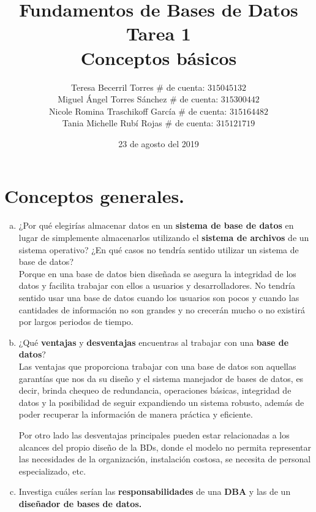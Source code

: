 \documentclass[letterpaper,12pt]{article}
\title{Fundamentos de Bases de Datos \\
        Tarea 1 \\
        Conceptos básicos}
\author{Teresa Becerril Torres
            $\#$ de cuenta: $315045132$ \\
            Miguel Ángel Torres Sánchez
            $\#$ de cuenta: $315300442$ \\
            Nicole Romina Traschikoff García
            $\#$ de cuenta: $315164482$ \\
            Tania Michelle Rubí Rojas
            $\#$ de cuenta: $315121719$}
\date{23 de agosto del 2019}
\begin{document}
    \maketitle

    \section{Conceptos generales.}
          \begin{enumerate}[a. ]

            \item ¿Por qué elegirías almacenar datos en un \textbf{sistema de base de datos} en lugar de simplemente almacenarlos utilizando el \textbf{sistema de archivos} de un sistema operativo? ¿En qué casos no tendría sentido utilizar un sistema de base de datos? \\

          Porque en una base de datos bien diseñada se asegura la integridad de los datos y facilita trabajar con ellos a usuarios y desarrolladores. No tendría sentido usar una base de datos cuando los usuarios son pocos y cuando las cantidades de información no son grandes y no crecerán mucho o no existirá por largos periodos de tiempo.

            \item ¿Qué \textbf{ventajas} y \textbf{desventajas} encuentras al trabajar con una \textbf{base de datos}?\\

            Las ventajas que proporciona trabajar con una base de datos son aquellas garantías que nos da su diseño y el sistema manejador de bases de datos, es decir, brinda chequeo de redundancia, operaciones básicas, integridad de datos y la posibilidad de seguir expandiendo un sistema robusto, además de poder recuperar la información de manera práctica y eficiente.

            Por otro lado las desventajas principales pueden estar relacionadas a los alcances del propio diseño de la BDs, donde el modelo no permita representar las necesidades de la organización, instalación costosa, se necesita de personal especializado, etc.


            \item Investiga cuáles serían las \textbf{responsabilidades} de una \textbf{DBA} y las de un \textbf{diseñador de bases de datos.}
            

\end{enumerate}
\end{document}
